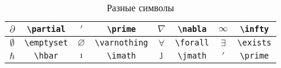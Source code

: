 \begin{table}
	\begin{tabular}{||c|c||c|c||c|c||c|c||}
		\hline $\partial$ & \Verb|\partial| 
		& $\prime$ & \Verb|\prime| 
		& $\nabla$ & \Verb|\nabla| 
		& $\infty$ & \Verb|\infty| \\
		\hline  $\emptyset$ & \Verb|\emptyset| 
		& $\varnothing$ & \Verb|\varnothing| 
		& $\forall$ & \Verb|\forall| 
		& $\exists$ & \Verb|\exists| \\ 
		\hline $\hbar$ & \Verb|\hbar| 
		& $\imath$ & \Verb|\imath| 
		& $\jmath$ & \Verb|\jmath| 
		& $\prime$ & \Verb|\prime| \\ 
		\hline
	\end{tabular}
	\caption{Разные символы}
\end{table}